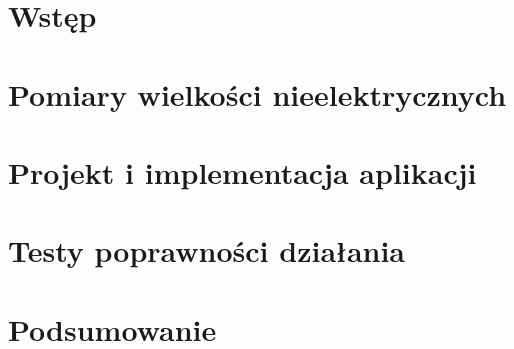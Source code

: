 \chapter{Wstęp}


\chapter{Pomiary wielkości nieelektrycznych}


\chapter{Projekt i implementacja aplikacji}


\chapter{Testy poprawności działania}


\chapter{Podsumowanie}
